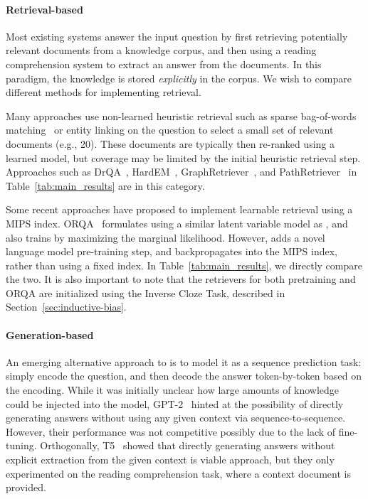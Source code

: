 \documentclass{article}
\begin{document}
\paragraph{Retrieval-based \openqa}
Most existing \openqa systems answer the input question by first retrieving potentially relevant documents from a knowledge corpus, and then using a reading comprehension system to extract an answer from the documents. In this paradigm, the knowledge is stored \emph{explicitly} in the corpus.
We wish to compare different methods for implementing retrieval.

Many approaches use non-learned heuristic retrieval such as sparse bag-of-words matching~\cite{bm25} or entity linking on the question to select a small set of relevant documents (e.g., 20). These documents are typically then re-ranked using a learned model, but coverage may be limited by the initial heuristic retrieval step. Approaches such as DrQA~\cite{drqa}, HardEM~\cite{openqa_hardem}, GraphRetriever~\cite{GraphRetriever}, and PathRetriever~\cite{rrp_salesforce} in Table~\ref{tab:main_results} are in this category.

Some recent approaches have proposed to implement learnable retrieval using a MIPS index. ORQA~\cite{orqa} formulates \openqa using a similar latent variable model as \thename, and also trains by maximizing the marginal likelihood. However, \thename adds a novel language model pre-training step, and backpropagates into the MIPS index, rather than using a fixed index. In Table~\ref{tab:main_results}, we directly compare the two. It is also important to note that the retrievers for both \thename pretraining and ORQA are initialized using the Inverse Cloze Task, described in Section~\ref{sec:inductive-bias}.





\paragraph{Generation-based \openqa}
An emerging alternative approach to \openqa is to model it as a sequence prediction task:
simply encode the question, and then decode the answer token-by-token based on the encoding.
While it was initially unclear how large amounts of knowledge could be injected into the model,
GPT-2~\cite{gpt2} hinted at the possibility of directly generating answers without using any given context via sequence-to-sequence. However, their performance was not competitive possibly due to the lack of fine-tuning. Orthogonally, T5~\cite{t5} showed that directly generating answers without explicit extraction from the given context is viable approach, but they only experimented on the reading comprehension task, where a context document is provided.
\end{document}
